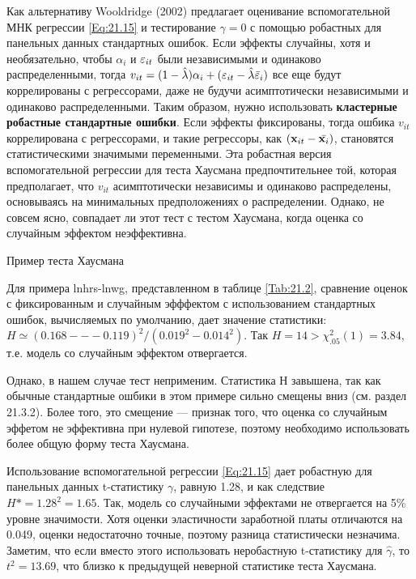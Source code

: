 Как альтернативу Wooldridge (2002) предлагает оценивание вспомогательной МНК регрессии \ref{Eq:21.15} и тестирование $\gamma=0$ с помощью робастных для панельных данных стандартных ошибок. Если эффекты случайны, хотя и необязательно, чтобы $\alpha_i$ и $\varepsilon_{it}$ были независимыми и одинаково распределенными, тогда $v_{it}=(1-\hat{\lambda})\alpha_i+(\varepsilon_{it}-\hat{\lambda}\bar{\varepsilon}_i)$ все еще будут коррелированы с регрессорами, даже не будучи асимптотически независимыми и одинаково распределенными. Таким образом, нужно использовать \textbf{кластерные робастные стандартные ошибки}. Если эффекты фиксированы, тогда ошбика  $v_{it}$ коррелирована с регрессорами, и такие регрессоры, как $(\mathbf{x}_{it}-\bar{\mathbf{x}_i})$, становятся статистическими значимыми переменными. Эта робастная версия вспомогательной регрессии для теста Хаусмана предпочтительнее той, которая предполагает, что  $v_{it}$ асимптотически независимы и одинаково распределены, основываясь на минимальных предположениях о распределении. Однако, не совсем ясно, совпадает ли этот тест с тестом Хаусмана, когда оценка со случайным эффектом неэффективна.


{\centering
Пример теста Хаусмана\\}

Для примера lnhrs-lnwg, представленном в таблице \ref{Tab:21.2}, сравнение оценок с фиксированным и случайным эфффектом с использованием стандартных ошибок, вычисляемых по умолчанию, дает значение статистики: $H \simeq (0.168 --- 0.119)^2/(0.019^2-0.014^2)$. Так $H=14 > \chi^2_{.05}(1)=3.84$, т.е. модель со случайным эффектом отвергается.

Однако, в нашем случае тест неприменим. Статистика $Н$ завышена, так как обычные стандартные ошбики в этом примере сильно смещены вниз (см. раздел 21.3.2). Более того, это смещение  --- признак того, что оценка со случайным эффетом не эффективна при нулевой гипотезе, поэтому необходимо использовать более общую форму теста Хаусмана.

Использование вспомогательной регрессии \ref{Eq:21.15}  дает робастную для панельных данных t-статистику  $\gamma$, равную 1.28, и как следствие $H*=1.28^2=1.65$. Так, модель со случайными эффектами не отвергается на 5\% уровне значимости. Хотя оценки эластичности заработной платы отличаются на 0.049, оценки недостаточно точные, поэтому разница статистически незначима. Заметим, что если вместо этого использовать неробастную t-статистику для $\hat{\gamma}$, то $t^2=13.69$, что близко к предыдущей неверной статистике теста Хаусмана.

